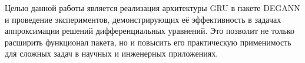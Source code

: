 Целью данной работы является реализация архитектуры GRU в пакете DEGANN и проведение экспериментов, демонстрирующих её эффективность в задачах аппроксимации решений дифференциальных уравнений. Это позволит не только расширить функционал пакета, но и повысить его практическую применимость для сложных задач в научных и инженерных приложениях.
